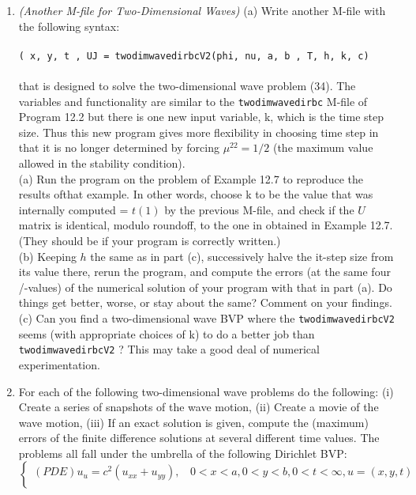 \documentclass[../main.tex]{subfiles}
\begin{document}
{{\begin{enumerate}
results seem better when the CFL condition is satisfied? Do some experiments. Compare with 
the performance of \texttt{onedimwaveimpl$\_$4} as was seen in Exercise for the Reader 12.9. 
	\item 
		\textit{(Another M-file for Two-Dimensional Waves)} (a) Write another M-file with the following 
syntax: 
\\
\\
	\texttt{( x, y, t , UJ = twodimwavedirbcV2(phi, nu, a, b , T, h, k, c) }
\\
\\
that is designed to solve the two-dimensional wave problem (34). The variables and functionality are similar to the \texttt{twodimwavedirbc} M-file of Program 12.2 but there is one new input variable, k, which is the time step size. Thus this new program gives more flexibility in choosing time step in that it is no longer determined by forcing $\mu ^22 =1/2$ (the maximum value allowed in the stability condition). 
\\
(a) Run the program on the problem of Example 12.7 to reproduce the results ofthat example. In other words, choose k to be the value that was internally computed = $t(1)$ by the previous M-file, and check if the $U$ matrix is identical, modulo roundoff, to the one in obtained in Example 12.7. (They should be if your program is correctly written.) 
\\
(b) Keeping $h$ the same as in part (c), successively halve the it-step size from its value there, rerun the program, and compute the errors (at the same four /-values) of the numerical solution of your program with that in part (a). Do things get better, worse, or stay about the same? Comment on your findings. 
\\
(c) Can you find a two-dimensional wave BVP where the \texttt{twodimwavedirbcV2} seems (with appropriate choices of k) to do a better job than \texttt{twodimwavedirbcV2} ? This may take a good deal of numerical experimentation.
	\item
		For each of the following two-dimensional wave problems do the following: (i) Create a series of snapshots of the wave motion, (ii) Create a movie of the 	wave motion, (iii) If an exact solution is given, compute the (maximum) errors of the finite difference solutions at several different time values. The problems all fall under the umbrella of the following Dirichlet BVP: 
$$	\begin{cases} 
	(PDE) u_u=c^2 (u_{xx}+u_{yy}),~~~~0<x<a, 0<y<b,0<t<\infty,u=(x,y,t)\\

\end{cases}$$
\end{enumerate}}}
\end{document}
